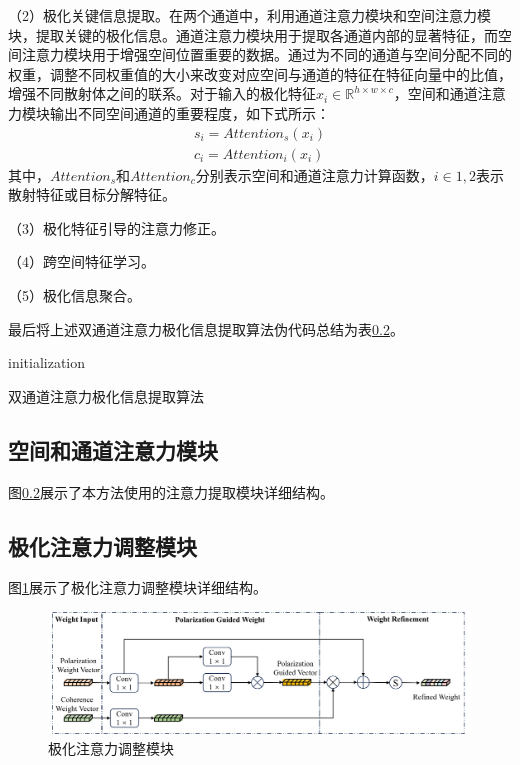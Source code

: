 （2）极化关键信息提取。在两个通道中，利用通道注意力模块和空间注意力模块，提取关键的极化信息。通道注意力模块用于提取各通道内部的显著特征，而空间注意力模块用于增强空间位置重要的数据。通过为不同的通道与空间分配不同的权重，调整不同权重值的大小来改变对应空间与通道的特征在特征向量中的比值，增强不同散射体之间的联系。对于输入的极化特征$x_i \in \mathbb{R}^{h \times w \times c}$，空间和通道注意力模块输出不同空间通道的重要程度，如下式所示：
\begin{align}
    s_i=Attention_s\left( x_i \right)
    \\
    c_i=Attention_i\left( x_i \right)
\end{align}
其中，$Attention_s$和$Attention_c$分别表示空间和通道注意力计算函数，$i \in {1,2}$表示散射特征或目标分解特征。

（3）极化特征引导的注意力修正。

（4）跨空间特征学习。

（5）极化信息聚合。

最后将上述双通道注意力极化信息提取算法伪代码总结为表\ref{}。

\begin{algorithm}[H]
    initialization\;
    \caption{双通道注意力极化信息提取算法}
\end{algorithm}


\subsection{空间和通道注意力模块}
图\ref{}展示了本方法使用的注意力提取模块详细结构。

\subsection{极化注意力调整模块}
图\ref{DPEN_WFM}展示了极化注意力调整模块详细结构。
\begin{figure}[h]
    \centering
    \includegraphics[width=14cm]{pic/chapter3/DPEN_WFM.png}
    \caption{极化注意力调整模块}
    \label{DPEN_WFM}
\end{figure}

